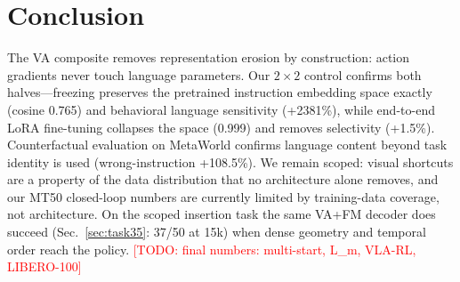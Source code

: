 \documentclass[10pt,twocolumn]{article}
\newcommand{\todo}[1]{\textcolor{red}{[TODO: #1]}}
\begin{document}
\section{Conclusion}
\label{sec:conclusion}
The VA composite removes representation erosion by construction: action
gradients never touch language parameters. Our $2\times2$ control confirms
both halves---freezing preserves the pretrained instruction embedding space
exactly (cosine 0.765) and behavioral language sensitivity (+2381\%), while
end-to-end LoRA fine-tuning collapses the space (0.999) and removes
selectivity (+1.5\%). Counterfactual evaluation on MetaWorld confirms
language content beyond task identity is used (wrong-instruction +108.5\%).
We remain scoped: visual shortcuts are a property of the data distribution
that no architecture alone removes, and our MT50 closed-loop numbers are
currently limited by training-data coverage, not architecture. On the
scoped insertion task the same VA+FM decoder does succeed
(Sec.~\ref{sec:task35}: 37/50 at 15k) when dense geometry and temporal
order reach the policy.
\todo{final numbers: multi-start, L\_m, VLA-RL, LIBERO-100}



\end{document}
